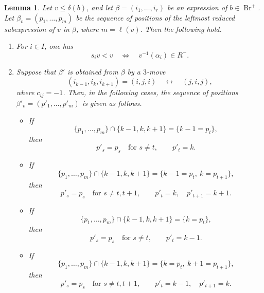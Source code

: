 \documentclass[10pt,a4paper]{amsart}
\newtheorem{lemma}{Lemma}
\newcommand{\Br}{{\operatorname{Br}}}
\begin{document}
\begin{lemma}\label{lem:beta3move}
Let \(v\le \delta(b)\), and let
\(
\beta=(i_1,\dots,i_r)
\)
be an expression of \(b\in \Br^+\). Let
\(
\beta_v=(p_1,\dots,p_m)
\)
be the sequence of positions of the leftmost reduced subexpression of \(v\) in
\(\beta\), where \(m=\ell(v)\). Then the following hold.

\begin{enumerate}
\item For \(i\in I\), one has
\[
s_iv<v
\quad\Longleftrightarrow\quad
v^{-1}(\alpha_i)\in R^-.
\]

\item Suppose that \(\beta'\) is obtained from \(\beta\) by a \(3\)-move
\[
(i_{k-1},i_k,i_{k+1})=(i,j,i)
\quad\longleftrightarrow\quad
(j,i,j),
\]
where \(c_{ij}=-1\). Then, in the following cases, the sequence of positions
\(\beta'_v=(p'_1,\dots,p'_m)\) is given as follows.

\begin{itemize}
\item[(1)] If
\[
\{p_1,\dots,p_m\}\cap\{k-1,k,k+1\}=\{k-1=p_t\},
\]
then
\[
p'_s=p_s \quad \text{for }s\neq t,
\qquad
p'_t=k.
\]

\item[(2)] If
\[
\{p_1,\dots,p_m\}\cap\{k-1,k,k+1\}
=
\{k-1=p_t,\ k=p_{t+1}\},
\]
then
\[
p'_s=p_s \quad \text{for }s\neq t,t+1,
\qquad
p'_t=k,\quad p'_{t+1}=k+1.
\]

\item[(3)] If
\[
\{p_1,\dots,p_m\}\cap\{k-1,k,k+1\}=\{k=p_t\},
\]
then
\[
p'_s=p_s \quad \text{for }s\neq t,
\qquad
p'_t=k-1.
\]

\item[(4)] If
\[
\{p_1,\dots,p_m\}\cap\{k-1,k,k+1\}
=
\{k=p_t,\ k+1=p_{t+1}\},
\]
then
\[
p'_s=p_s \quad \text{for }s\neq t,t+1,
\qquad
p'_t=k-1,\quad p'_{t+1}=k.
\]
\end{itemize}
\end{enumerate}
\end{lemma}
\end{document}
